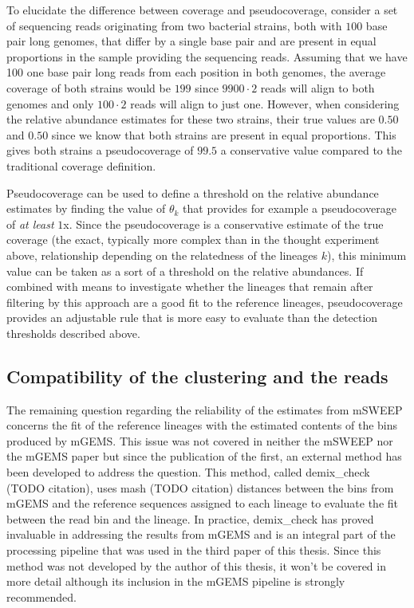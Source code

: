 \documentclass[officiallayout]{tktla}
\begin{document}
To elucidate the difference between coverage and pseudocoverage,
consider a set of sequencing reads originating from two bacterial
strains, both with $100$ base pair long genomes, that differ by a
single base pair and are present in equal proportions in the sample
providing the sequencing reads. Assuming that we have 100 one base
pair long reads from each position in both genomes, the average
coverage of both strains would be $199$ since $9900\cdot2$ reads
will align to both genomes and only $100\cdot2$ reads will align to
just one. However, when considering the relative abundance estimates
for these two strains, their true values are $0.50$ and $0.50$ since
we know that both strains are present in equal proportions. This gives
both strains a pseudocoverage of $99.5$ \textemdash{ } a conservative
value compared to the traditional coverage definition.

Pseudocoverage can be used to define a threshold on the relative
abundance estimates by finding the value of $\theta_{k}$ that provides
for example a pseudocoverage of \textit{at least} $1$x. Since the
pseudocoverage is a conservative estimate of the true coverage (the
exact, typically more complex than in the thought experiment above,
relationship depending on the relatedness of the lineages $k$), this
minimum value can be taken as a sort of a threshold on the relative
abundances. If combined with means to investigate whether the lineages
that remain after filtering by this approach are a good fit to the
reference lineages, pseudocoverage provides an adjustable rule that is
more easy to evaluate than the detection thresholds described above.

\subsection{Compatibility of the clustering and the reads}
The remaining question regarding the reliability of the estimates from
mSWEEP concerns the fit of the reference lineages with the estimated
contents of the bins produced by mGEMS. This issue was not covered in
neither the mSWEEP nor the mGEMS paper but since the publication of
the first, an external method has been developed to address the
question. This method, called demix\_check (TODO citation), uses mash
(TODO citation) distances between the bins from mGEMS and the
reference sequences assigned to each lineage to evaluate the fit
between the read bin and the lineage. In practice, demix\_check has
proved invaluable in addressing the results from mGEMS and is an
integral part of the processing pipeline that was used in the third
paper of this thesis. Since this method was not developed by the
author of this thesis, it won't be covered in more detail although its
inclusion in the mGEMS pipeline is strongly recommended.
\end{document}
